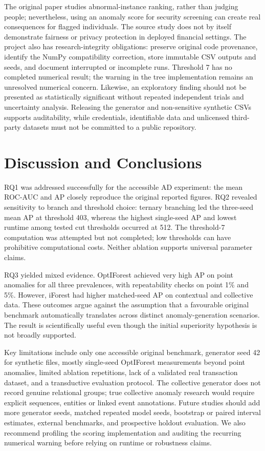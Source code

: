 \documentclass[11pt]{article}
\begin{document}
The original paper studies abnormal-instance ranking, rather than judging people; nevertheless, using an anomaly score for security screening can create real consequences for flagged individuals. The source study does not by itself demonstrate fairness or privacy protection in deployed financial settings. The project also has research-integrity obligations: preserve original code provenance, identify the NumPy compatibility correction, store immutable CSV outputs and seeds, and document interrupted or incomplete runs. Threshold 7 has no completed numerical result; the warning in the tree implementation remains an unresolved numerical concern. Likewise, an exploratory finding should not be presented as statistically significant without repeated independent trials and uncertainty analysis. Releasing the generator and non-sensitive synthetic CSVs supports auditability, while credentials, identifiable data and unlicensed third-party datasets must not be committed to a public repository.
 
\section{Discussion and Conclusions}
RQ1 was addressed successfully for the accessible AD experiment: the mean ROC-AUC and AP closely reproduce the original reported figures. RQ2 revealed sensitivity to branch and threshold choice: ternary branching led the three-seed mean AP at threshold 403, whereas the highest single-seed AP and lowest runtime among tested cut thresholds occurred at 512. The threshold-7 computation was attempted but not completed; low thresholds can have prohibitive computational costs. Neither ablation supports universal parameter claims.
 
RQ3 yielded mixed evidence. OptIForest achieved very high AP on point anomalies for all three prevalences, with repeatability checks on point 1\% and 5\%. However, iForest had higher matched-seed AP on contextual and collective data. These outcomes argue against the assumption that a favourable original benchmark automatically translates across distinct anomaly-generation scenarios. The result is scientifically useful even though the initial superiority hypothesis is not broadly supported.
 
Key limitations include only one accessible original benchmark, generator seed 42 for synthetic files, mostly single-seed OptIForest measurements beyond point anomalies, limited ablation repetitions, lack of a validated real transaction dataset, and a transductive evaluation protocol. The collective generator does not record genuine relational groups; true collective anomaly research would require explicit sequences, entities or linked event annotations. Future studies should add more generator seeds, matched repeated model seeds, bootstrap or paired interval estimates, external benchmarks, and prospective holdout evaluation. We also recommend profiling the scoring implementation and auditing the recurring numerical warning before relying on runtime or robustness claims.
 
\end{document}
